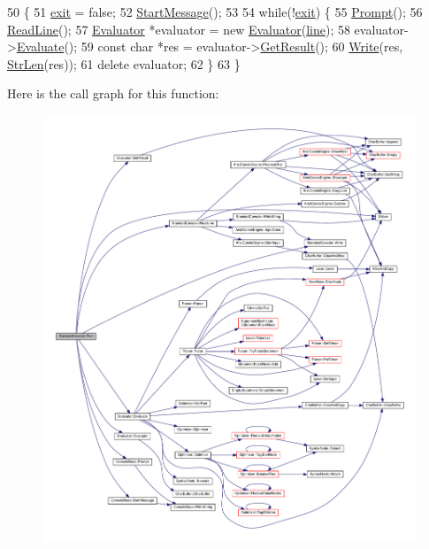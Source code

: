 \begin{DoxyCode}
50 \{
51     \hyperlink{classStandardConsole_a67538cb9ac4d002b2341386fab0b1f13}{exit} = \textcolor{keyword}{false};
52     \hyperlink{classConsoleBase_a1a390339da026c37c036f87f3a084e87}{StartMessage}();
53 
54     \textcolor{keywordflow}{while}(!\hyperlink{classStandardConsole_a67538cb9ac4d002b2341386fab0b1f13}{exit}) \{
55         \hyperlink{classConsoleBase_a79c5aa072ff3db35944a9825dcbfd9a7}{Prompt}();
56         \hyperlink{classStandardConsole_a387d8a0bf9d6ec722868026f58393942}{ReadLine}();
57         \hyperlink{classEvaluator}{Evaluator} *evaluator = \textcolor{keyword}{new} \hyperlink{classEvaluator}{Evaluator}(\hyperlink{classStandardConsole_a2ed234e29cf0056dfdc40bac5f7dd438}{line});
58         evaluator->\hyperlink{classEvaluator_a40b30ece9d43c658877ee7f52aaec0a8}{Evaluate}();
59         \textcolor{keyword}{const} \textcolor{keywordtype}{char} *res = evaluator->\hyperlink{classEvaluator_abcc678772175bf00127a3b307463ae4b}{GetResult}();
60         \hyperlink{classStandardConsole_a43844eb181d640c0e4860ef21c2e8fa7}{Write}(res, \hyperlink{clib_8h_a67ec56eb98b49515d35005a5b3bf9a32}{StrLen}(res));
61         \textcolor{keyword}{delete} evaluator;
62     \}
63 \}
\end{DoxyCode}


Here is the call graph for this function\+:
\nopagebreak
\begin{figure}[H]
\begin{center}
\leavevmode
\includegraphics[width=350pt]{d5/d48/classStandardConsole_a9380023bba612b816b134589130bb254_cgraph}
\end{center}
\end{figure}


